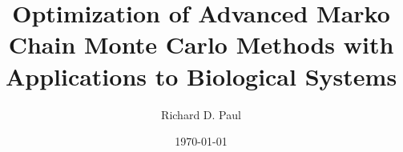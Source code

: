 \documentclass[
t, %
10pt, %
aspectratio=169, %
ngerman,
english,
]{beamer}
\title{Optimization of Advanced Marko Chain Monte Carlo Methods with Applications to Biological Systems}
\author{Richard D. Paul}
\institute[]{Forschungszentrum J\"ulich}
\date{\today}
\begin{document}
    \maketitle

    
    
    \begin{frame}
        \tiny
	
	
    \end{frame}
\end{document}
